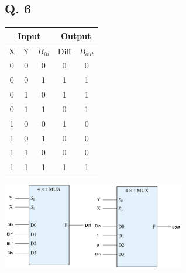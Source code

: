 \subsection*{Q. 6}
\begin{longtable}[c]{ccc|cc}
\multicolumn{3}{c|}{Input\quad} & \multicolumn{2}{c}{Output\quad} \\ \hline
\endfirsthead
%
\endhead
%
\hline
\endfoot
%
\endlastfoot
%
X     & Y    & $B_{in}$    & Diff      & $B_{out}$      \\ \hline
0     & 0    & 0           & 0         & 0              \\
0     & 0    & 1           & 1         & 1              \\
0     & 1    & 0           & 1         & 1              \\
0     & 1    & 1           & 0         & 1              \\
1     & 0    & 0           & 1         & 0              \\
1     & 0    & 1           & 0         & 0              \\
1     & 1    & 0           & 0         & 0              \\
1     & 1    & 1           & 1         & 1              \\ \hline
\end{longtable}
\centerline{\includegraphics[width=0.3\textwidth]{fig/q61}\qquad \includegraphics[width=0.3\textwidth]{fig/q62}}

